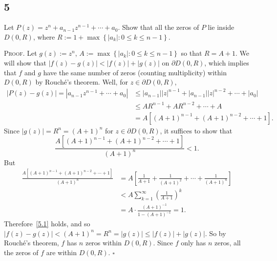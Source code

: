 \documentclass[12pt]{article}
\newcounter{ProofCounter}
\newenvironment{Proof}{\stepcounter{ProofCounter}\textsc{Proof.}}{\hfill$\square$}
\begin{document}
\subsection*{5}
\begin{tcolorbox}
  Let $P(z) = z^n + a_{n-1}z^{n-1} + \cdots + a_0$. Show that all the zeros of $P$ lie inside $D(0,R)$, where $R := 1 + \max\left\{
  |a_k| : 0 \leq k \leq n-1\right\}$.
\end{tcolorbox}
\begin{Proof}
  Let $g(z) := z^{n}$, $A := \max\left\{ |a_k| : 0\leq k \leq n-1 \right\}$ so that $R = A + 1$. We will show that $|f(z) - g(z)| < |f(z)| + |g(z)|$ on
  $\partial D(0,R)$, which implies that $f$ and $g$ have the same number of zeros (counting multiplicity) within $D(0,R)$ by Rouch\'{e}'s theorem.
  Well, for $z \in \partial D(0,R)$,
  \begin{align*}
    |P(z) - g(z)| = |a_{n-1}z^{n-1} + \cdots + a_0| & \leq |a_{n-1}||z|^{n-1} + |a_{n-1}||z|^{n-2} + \cdots + |a_{0}| \\
    & \leq AR^{n-1} + AR^{n-2} + \cdots + A \\
    & = A[(A+1)^{n-1} + (A + 1)^{n-2} + \cdots + 1].
  \end{align*}
  Since $|g(z)| = R^{n} = (A + 1)^{n}$ for $z\in \partial D(0,R)$, it suffices to show that
  \begin{equation}
    \frac{A[(A+1)^{n-1} + (A + 1)^{n-2} + \cdots + 1]}{(A + 1)^{n}} < 1.
    \label{5.1}
  \end{equation}
  But
  \begin{align*}
    \frac{A[(A+1)^{n-1} + (A + 1)^{n-2} + \cdots + 1]}{(A + 1)^{n}} & = A\left[ \frac{1}{A+1} + \frac{1}{(A+1)^{2}} + \cdots + \frac{1}{(A+1)^{n}}
    \right] \\
    & < A\sum_{k=1}^{\infty}\left( \frac{1}{A + 1} \right)^{k} \\
    & = A\cdot \frac{(A + 1)^{-1}}{1 - (A+1)^{-1}} = 1.
  \end{align*}
  Therefore~\eqref{5.1} holds, and so $|f(z) - g(z)| < (A + 1)^{n} = R^{n} = |g(z)| \leq |f(z)| + |g(z)|$. So by Rouch\'{e}'s theorem, $f$ has $n$
  zeros within $D(0,R)$. Since $f$ only has $n$ zeros, all the zeros of $f$ are within $D(0,R)$.
\end{Proof}


\newpage
\end{document}
